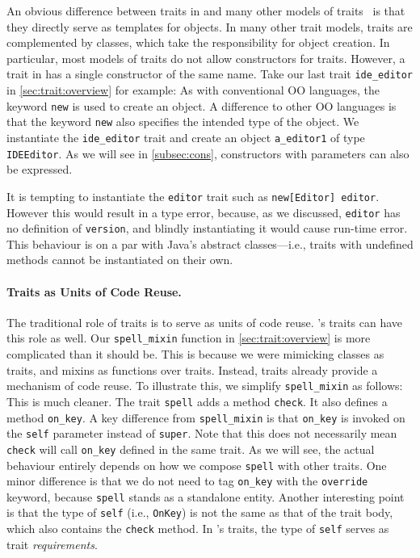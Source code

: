 An obvious difference between traits in \sedel and many other models of
traits~\citep{scharli2003traits,fisher2004typed,odersky2005scalable} is that they
directly serve as templates for objects. In many other trait models, traits are
complemented by classes, which take the responsibility for object creation. In
particular, most models of traits do not allow constructors for traits. However,
a trait in \sedel has a single constructor of the same name. Take our last trait
\lstinline{ide_editor} in \cref{sec:trait:overview} for example:
As with conventional OO languages, the keyword \lstinline{new} is used to create
an object. A difference to other OO languages is that the keyword
\lstinline{new} also specifies the intended type of the object. We instantiate
the \lstinline{ide_editor} trait and create an object \lstinline{a_editor1} of
type \lstinline{IDEEditor}. As we will see in \cref{subsec:cons}, constructors
with parameters can also be expressed.

It is tempting to instantiate the \lstinline{editor} trait such as
\lstinline{new[Editor] editor}. However this would result in a type error, because, as
we discussed, \lstinline{editor} has no definition of \lstinline{version}, and
blindly instantiating it would cause run-time error. This behaviour is on a par
with Java's abstract classes---i.e., traits with undefined methods cannot be instantiated on their own.

\paragraph{Traits as Units of Code Reuse.}
The traditional role of traits is to serve as units of code reuse. \sedel's traits
can have this role as well.
Our \lstinline{spell_mixin} function in \cref{sec:trait:overview} is more complicated than it should be.
This is because we were mimicking classes as traits, and
mixins as functions over traits. Instead, traits already provide a mechanism of
code reuse. To illustrate this, we simplify \lstinline{spell_mixin} as follows:
This is much cleaner. The trait \lstinline{spell} adds a method
\lstinline{check}. It also defines a method \lstinline{on_key}.
A key difference from \lstinline{spell_mixin} is that \lstinline{on_key} is invoked on the \lstinline{self}
parameter instead of \lstinline{super}. Note that this does not necessarily mean \lstinline{check} will call \lstinline{on_key}
defined in the same trait. As we will see, the actual behaviour entirely depends on how we compose \lstinline{spell}
with other traits. One minor difference is that we do not need to tag \lstinline{on_key}
with the \lstinline{override} keyword, because \lstinline{spell} stands as a standalone entity.
Another interesting point is that the type of \lstinline{self} (i.e., \lstinline{OnKey})
is not the same as that of the trait body, which also contains the \lstinline{check} method.
In \sedel's traits, the type of \lstinline{self} serves as trait \emph{requirements}.


